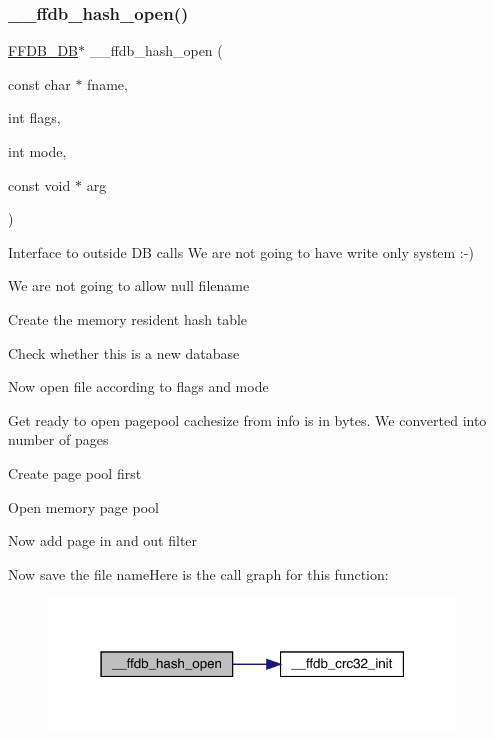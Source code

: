 \subsubsection{\texorpdfstring{\_\_ffdb\_hash\_open()}{\_\_ffdb\_hash\_open()}}
{\footnotesize\ttfamily \mbox{\hyperlink{adat-devel_2other__libs_2filedb_2filehash_2ffdb__db_8h_a0b27b956926453a7a8141ea8e10f0df8}{F\+F\+D\+B\+\_\+\+DB}}$\ast$ \+\_\+\+\_\+ffdb\+\_\+hash\+\_\+open (\begin{DoxyParamCaption}\item[{const char $\ast$}]{fname,  }\item[{int}]{flags,  }\item[{int}]{mode,  }\item[{const void $\ast$}]{arg }\end{DoxyParamCaption})}

Interface to outside DB calls We are not going to have write only system \+:-\/)

We are not going to allow null filename

Create the memory resident hash table

Check whether this is a new database

Now open file according to flags and mode

Get ready to open pagepool cachesize from info is in bytes. We converted into number of pages

Create page pool first

Open memory page pool

Now add page in and out filter

Now save the file nameHere is the call graph for this function\+:
\nopagebreak
\begin{figure}[H]
\begin{center}
\leavevmode
\includegraphics[width=307pt]{d1/d7a/adat-devel_2other__libs_2filedb_2filehash_2ffdb__hash_8c_ae249c66e95687ce85bfd206872a6e64e_cgraph}
\end{center}
\end{figure}
\mbox{\label{adat-devel_2other__libs_2filedb_2filehash_2ffdb__hash_8c_a2f4a425a3740bb0320ef61b8c9fdcef1}} 
